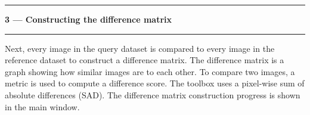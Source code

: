 \noindent\rule{\textwidth}{1pt}
\indent \textbf{3 --- Constructing the difference matrix}
\noindent\rule{\textwidth}{1pt}
\smallskip
\parbox{\textwidth}{Next, every image in the query dataset is compared to every image in the reference dataset to construct a difference matrix. The difference matrix is a graph showing how similar images are to each other. To compare two images, a metric is used to compute a difference score. The toolbox uses a pixel-wise sum of absolute differences (SAD). The difference matrix construction progress is shown in the main window.}
\smallskip
